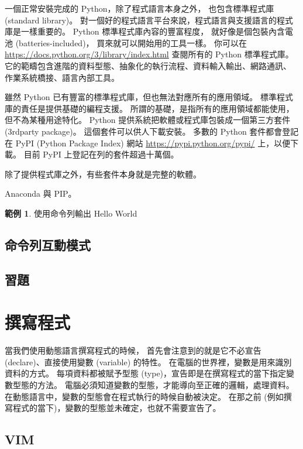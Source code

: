\documentclass[a4paper,12pt]{book}
\theoremstyle{definition}
\newtheorem{example}{範例}[chapter]
\begin{document}
一個正常安裝完成的 Python，除了程式語言本身之外，
也包含標準程式庫 (standard library)。
對一個好的程式語言平台來說，程式語言與支援語言的程式庫是一樣重要的。
Python 標準程式庫內容的豐富程度，
就好像是個包裝內含電池 (batteries-included)，
買來就可以開始用的工具一樣。
你可以在 \url{https://docs.python.org/3/library/index.html}
查閱所有的 Python 標準程式庫。
它的範疇包含進階的資料型態、抽象化的執行流程、資料輸入輸出、網路通訊、
作業系統橋接、語言內部工具。

雖然 Python 已有豐富的標準程式庫，但也無法對應所有的應用領域。
標準程式庫的責任是提供基礎的編程支援。
所謂的基礎，是指所有的應用領域都能使用，但不為某種用途特化。
Python 提供系統把軟體或程式庫包裝成一個第三方套件 (3rdparty package)。
這個套件可以供人下載安裝。
多數的 Python 套件都會登記在 PyPI (Python Package Index) 網站
\url{https://pypi.python.org/pypi/} 上，以便下載。
目前 PyPI 上登記在列的套件超過十萬個。

除了提供程式庫之外，有些套件本身就是完整的軟體。

Anaconda 與 PIP。

\begin{example}
使用命令列輸出 Hello World
\end{example}

\section{命令列互動模式}

\section{習題}

\chapter{撰寫程式}
%
\label{c:write}

當我們使用動態語言撰寫程式的時候，
首先會注意到的就是它不必宣告 (declare)、直接使用變數 (variable) 的特性。
在電腦的世界裡，變數是用來識別資料的方式。
每項資料都被賦予型態 (type)，宣告即是在撰寫程式的當下指定變數型態的方法。
電腦必須知道變數的型態，才能導向至正確的邏輯，處理資料。
在動態語言中，變數的型態會在程式執行的時候自動被決定。
在那之前 (例如撰寫程式的當下)，變數的型態並未確定，也就不需要宣告了。

\section{VIM}
\end{document}
